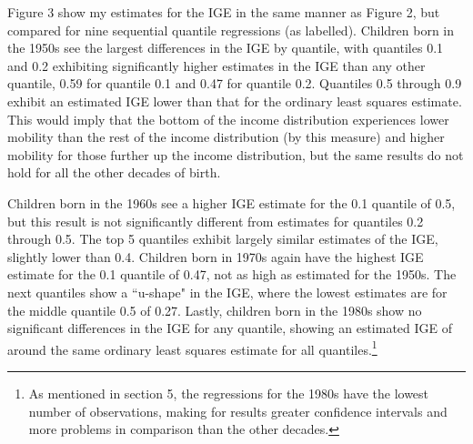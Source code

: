 \documentclass[notitlepage,12pt]{article}
\begin{document}
Figure 3 show my estimates for the IGE in the same manner as Figure 2, but compared for nine sequential quantile regressions (as labelled).  Children born in the 1950s see the largest differences in the IGE by quantile, with quantiles 0.1 and 0.2 exhibiting significantly higher estimates in the IGE than any other quantile, 0.59 for quantile 0.1 and 0.47 for quantile 0.2.  Quantiles 0.5 through 0.9 exhibit an estimated IGE lower than that for the ordinary least squares estimate.  This would imply that the bottom of the income distribution experiences lower mobility than the rest of the income distribution (by this measure) and higher mobility for those further up the income distribution, but the same results do not hold for all the other decades of birth.

Children born in the 1960s see a higher IGE estimate for the 0.1 quantile of 0.5, but this result is not significantly different from estimates for quantiles 0.2 through 0.5.  The top 5 quantiles exhibit largely similar estimates of the IGE, slightly lower than 0.4.  Children born in 1970s again have the highest IGE estimate for the 0.1 quantile of 0.47, not as high as estimated for the 1950s.  The next quantiles show a ``u-shape" in the IGE, where the lowest estimates are for the middle quantile 0.5 of 0.27.  Lastly, children born in the 1980s show no significant differences in the IGE for any quantile, showing an estimated IGE of around the same ordinary least squares estimate for all quantiles.\footnote{As mentioned in section 5, the regressions for the 1980s have the lowest number of observations, making for results greater confidence intervals and more problems in comparison than the other decades.}
\end{document}
